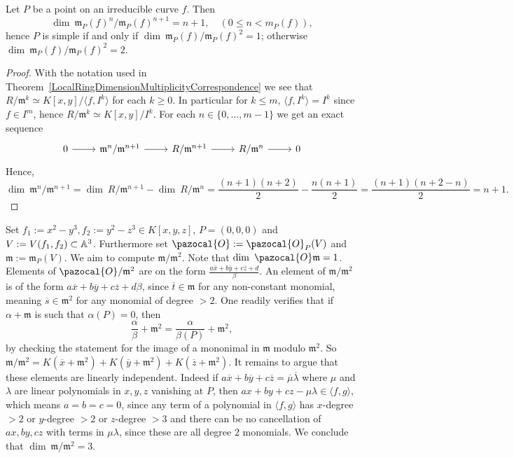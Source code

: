     \begin{proposition}\label{PlaneCurveDimensionOfMaximalIdealQuotientByMaximalIdealSquared}
        Let $P$ be a point on an irreducible curve $f$. Then 
        $$\dim\ \mathfrak{m}_P(f)^n/\mathfrak{m}_P(f)^{n+1} = n+1, \quad (0\leq n < m_P(f)),$$
        hence $P$ is simple if and only if $\dim\ \mathfrak{m}_P(f)/\mathfrak{m}_P(f)^2= 1$; otherwise $\dim\ \mathfrak{m}_P(f)/\mathfrak{m}_P(f)^2= 2$.
    \end{proposition}
    \begin{proof}
        With the notation used in Theorem~\ref{LocalRingDimensionMultiplicityCorrespondence} we see that $R/\mathfrak{m}^k \simeq K[x,y]/\langle f,I^k\rangle$ for each $k\geq 0$. In particular for $k\leq m$, $\langle f, I^k\rangle = I^k$ since $f\in I^m$, hence $R/\mathfrak{m}^k \simeq K[x,y]/I^k$. For each $n\in\{0,\dots,m-1\}$ we get an exact sequence 
        $$\begin{tikzcd}
            0\arrow[r] & \mathfrak{m}^n/\mathfrak{m}^{n+1} \arrow[r] &R/\mathfrak{m}^{n+1} \arrow[r] & R/\mathfrak{m}^n \arrow[r] & 0
        \end{tikzcd}$$
        Hence, $$\dim \ \mathfrak{m}^n/\mathfrak{m}^{n+1} = \dim\ R/\mathfrak{m}^{n+1}-\dim \ R/\mathfrak{m}^n = \frac{(n+1)(n+2)}{2}-\frac{n(n+1)}{2} = \frac{(n+1)(n+2-n)}{2}= n+1.$$
    \end{proof}
    \begin{example}\label{ExampleOfVarietyWhereMaximalIdealQuotientByMaximalIdealSquaredIsGreaterThan2}
        Set $f_1 := x^2 -y^3,f_2 := y^2-z^3\in K[x,y,z]$, $P=(0,0,0)$ and $V:=V(f_1,f_2)\subset \mathbb{A}^3$. Furthermore set $\pazocal{O}:=\pazocal{O}_P(V)$ and $\mathfrak{m}:= \mathfrak{m}_P(V)$. We aim to compute $\mathfrak{m}/\mathfrak{m}^2$. Note that $\dim\ \pazocal{O}\mathfrak{m} = 1$. Elements of $\pazocal{O}/\mathfrak{m}^2$ are on the form $\frac{a\overline{x}+b\overline{y}+c\overline{z}+d}{\beta}$. An element of $\mathfrak{m}/\mathfrak{m}^2$ is of the form ${a\overline{x}+b\overline{y}+c\overline{z}+d}{\beta}$, since $\overline{t}\in \mathfrak{m}$ for any non-constant monomial, meaning $\overline{s}\in\mathfrak{m}^2$ for any monomial of degree $>2$. One readily verifies that if $\alpha+\mathfrak{m}$ is such that $\alpha(P)=0$, then  
        $$\frac{\alpha}{\beta}+\mathfrak{m}^2= \frac{\alpha}{\beta(P)}+\mathfrak{m}^2,$$
        by checking the statement for the image of a mononimal in $\mathfrak{m}$ modulo $\mathfrak{m}^2$. So $\mathfrak{m}/\mathfrak{m}^2 = K (\overline{x}+\mathfrak{m}^2)+K (\overline{y}+\mathfrak{m}^2)+K(\overline{z}+\mathfrak{m}^2)$. It remains to argue that these elements are linearly independent. Indeed if $a\overline{x}+b\overline{y}+c\overline{z}=\overline{\mu}\overline{\lambda}$ where $\mu$ and $\lambda$ are linear polynomials in $x,y,z$ vanishing at $P$, then $ax+by+cz-\mu\lambda \in \langle f,g\rangle$, which means $a=b=c=0$, since any term of a polynomial in $\langle f,g\rangle$ has $x$-degree $>2$ or $y$-degree $>2$ or $z$-degree $>3$ and there can be no cancellation of $ax,by,cz$ with terms in $\mu\lambda$, since these are all degree $2$ monomials.  We conclude that $\dim\ \mathfrak{m}/\mathfrak{m}^2 = 3$.
    \end{example}
